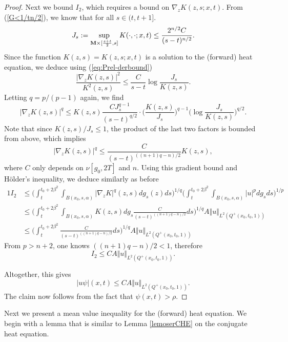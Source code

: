 \documentclass[11pt]{amsart}
\numberwithin{equation}{section}
\def\M{{\bf M}}
\numberwithin{equation}{section}
\begin{document}
\begin{proof}
Next we bound $I_2$, which requires a bound on $\nabla_z K(z,s ; x, t)$.
From (\ref{G<1/tn/2}), we know that for all $s \in (t, t+1]$.
\[ J_s := \sup_{\M \times [\frac{s+t}2,s]} K (\cdot, \cdot ; x, t) \leq \frac{2^{n/2} C}{(s-t)^{n/2}}. \]
Since the function $K(z,s) = K(z,s; x,t)$ is a solution to the (forward) heat equation, we deduce using (\ref{eq:Prel-derbound})
\[ \frac{|\nabla_z K(z,s)|^2}{K^2 (z,s)} \leq \frac{C}{s-t} \log \frac{J_s}{K(z,s)}. \]
Letting $q = p /(p-1)$ again, we find
\[ |\nabla_z K(z,s) |^q \leq K (z,s) \frac{C J_s^{q-1}}{(s-t)^{q/2}} \cdot \bigg( \frac{K(z,s)}{J_s} \bigg)^{q-1} \bigg( {\log \frac{J_s}{K(z,s)}} \bigg)^{q/2}. \]
Note that since $K(z,s) / J_s \leq 1$, the product of the last two factors is bounded from above, which implies
\[ |\nabla_z K(z,s) |^q \leq \frac{C}{(s-t)^{((n+1)q - n)/2}} K(z,s), \]
where $C$ only depends on $\nu[g_0, 2T]$ and $n$.
Using this gradient bound and H\"older's inequality, we deduce similarly as before
\begin{alignat*}{1}
I_2 &\leq \bigg( \int_t^{t_0 + 2\beta^2} \int_{B(x_0, s, \alpha)} |\nabla_z K|^q (z,s) dg_s (z) ds \bigg)^{1/q} \bigg( \int_t^{t_0 +2\beta^2} \int_{B(x_0, s, \alpha)} |u|^p dg_s ds \bigg)^{1/p} \\
&\leq \bigg( \int_t^{t_0 + 2\beta^2} \int_{B(x_0, s, \alpha)} K (z,s) dg_s \frac{C}{(s-t)^{((n+1)q - n)/2}} ds \bigg)^{1/q} A \Vert u \Vert_{L^2 (Q^+ (x_0, t_0, 1))} \\
&\leq \bigg( \int_t^{t_0 + 2\beta^2}  \frac{C}{(s-t)^{((n+1)q - n)/2}} ds \bigg)^{1/q} A \Vert u \Vert_{L^2 (Q^+ (x_0, t_0, 1))} 
\end{alignat*}
From $p > n+2$, one knows $((n+1)q - n)/2 < 1$, therefore
\[ I_2 \leq CA \Vert u \Vert_{L^2 (Q^+ (x_0, t_0, 1))}. \]

Altogether, this gives
\[ |u\psi|(x,t) \leq C A \Vert u \Vert_{L^2 (Q^+ (x_0, t_0, 1))}. \]
The claim now follows from the fact that $\psi (x,t) > \rho$.
\end{proof}

Next we present  a mean value inequality for the (forward) heat equation.
We begin with a lemma that is similar to Lemma \ref{lemoserCHE} on the conjugate heat equation.
\end{document}
